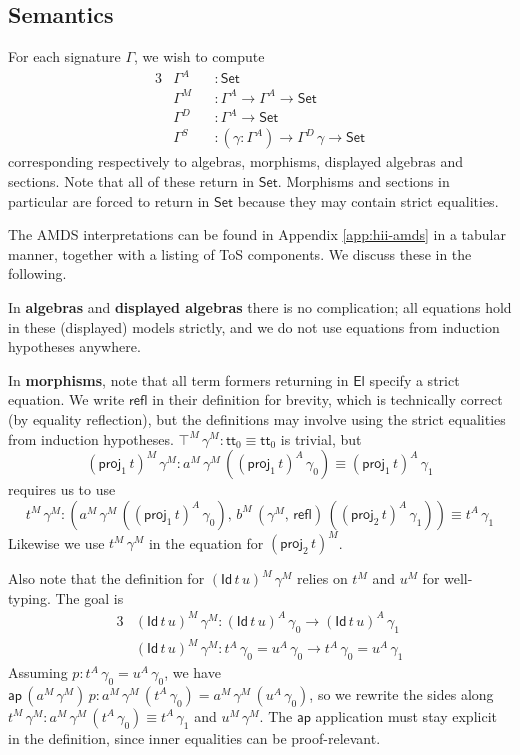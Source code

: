 \documentclass[12pt,a4paper,twoside,openany]{book}
\theoremstyle{remark}
\theoremstyle{definition}
\theoremstyle{theorem}
\newcommand{\ms}[1]{\mathsf{#1}}
\newcommand{\ap}{\ms{ap}}
\newcommand{\refl}{\mathsf{refl}}
\newcommand{\El}{\mathsf{El}}
\newcommand{\Id}{\mathsf{Id}}
\newcommand{\proj}{\mathsf{proj}}
\renewcommand{\tt}{\mathsf{tt}}
\newcommand{\Set}{\mathsf{Set}}
\begin{document}
\subsection{Semantics}


For each signature $\Gamma$, we wish to compute
\begin{alignat*}{3}
  &\Gamma^A &&: \Set\\
  &\Gamma^M &&: \Gamma^A \to \Gamma^A \to \Set\\
  &\Gamma^D &&: \Gamma^A \to \Set\\
  &\Gamma^S &&: (\gamma : \Gamma^A) \to \Gamma^D\,\gamma \to \Set
\end{alignat*}
corresponding respectively to algebras, morphisms, displayed algebras and
sections. Note that all of these return in $\Set$. Morphisms and sections in
particular are forced to return in $\Set$ because they may contain strict
equalities.

The AMDS interpretations can be found in Appendix \ref{app:hii-amds} in a
tabular manner, together with a listing of ToS components. We discuss these
in the following.

In \textbf{algebras} and \textbf{displayed algebras} there is no
complication; all equations hold in these (displayed) models strictly, and we
do not use equations from induction hypotheses anywhere.

In \textbf{morphisms}, note that all term formers returning in $\El$ specify a
strict equation. We write $\refl$ in their definition for brevity, which is
technically correct (by equality reflection), but the definitions may involve
using the strict equalities from induction hypotheses.  $\top^M\,\gamma^M :
\tt_0 \equiv \tt_0$ is trivial, but
\[  (\proj_1\,t)^M\,\gamma^M : a^M\,\gamma^M\,((\proj_1\,t)^A\,\gamma_0) \equiv (\proj_1\,t)^A\,\gamma_1\]
requires us to use
\[t^M\,\gamma^M : (a^M\,\gamma^M\,((\proj_1\,t)^A\,\gamma_0),\,b^M\,(\gamma^M,\,\refl)\,((\proj_2\,t)^A\,\gamma_1))
\equiv t^A\,\gamma_1 \]
Likewise we use $t^M\,\gamma^M$ in the equation for $(\proj_2\,t)^M$.

Also note that the definition for $(\Id\,t\,u)^M\,\gamma^M$ relies on $t^M$ and
$u^M$ for well-typing. The goal is
\begin{alignat*}{3}
  &(\Id\,t\,u)^M\,\gamma^M : (\Id\,t\,u)^A\,\gamma_0 \to (\Id\,t\,u)^A\,\gamma_1\\
  &(\Id\,t\,u)^M\,\gamma^M : t^A\,\gamma_0 = u^A\,\gamma_0 \to t^A\,\gamma_0 = u^A\,\gamma_1
\end{alignat*}
Assuming $p : t^A\,\gamma_0 = u^A\,\gamma_0$, we have $\ap\,(a^M\,\gamma^M)\,p :
a^M\,\gamma^M\,(t^A\,\gamma_0) = a^M\,\gamma^M\,(u^A\,\gamma_0)$, so we rewrite
the sides along $t^M\,\gamma^M : a^M\,\gamma^M\,(t^A\,\gamma_0) \equiv
t^A\,\gamma_1$ and $u^M\,\gamma^M$. The $\ap$ application must stay explicit in
the definition, since inner equalities can be proof-relevant.
\end{document}
